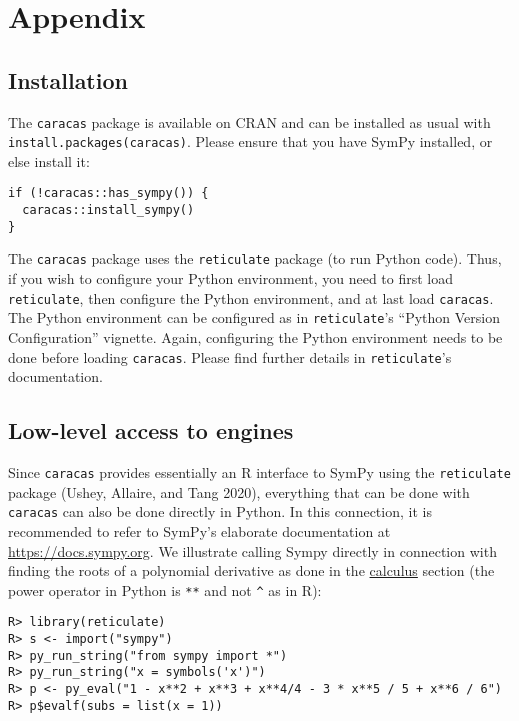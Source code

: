 \hypertarget{appendix}{%
\section{Appendix}\label{appendix}}

\hypertarget{installation}{%
\subsection{Installation}\label{installation}}

The \texttt{caracas} package is available on CRAN and can be installed as usual with \texttt{install.packages(\textquotesingle{}caracas\textquotesingle{})}.
Please ensure that you have SymPy installed, or else install it:

\begin{verbatim}
if (!caracas::has_sympy()) {
  caracas::install_sympy()
}
\end{verbatim}

The \texttt{caracas} package uses the \texttt{reticulate} package (to run Python code).
Thus, if you wish to configure your Python environment, you need to
first load \texttt{reticulate}, then configure the Python environment, and at
last load \texttt{caracas}.
The Python environment can be configured as
in \texttt{reticulate}'s ``Python Version Configuration'' vignette.
Again, configuring the Python environment needs to be done before
loading \texttt{caracas}.
Please find further details in \texttt{reticulate}'s documentation.

\hypertarget{low-level-access-to-engines}{%
\subsection{Low-level access to engines}\label{low-level-access-to-engines}}

Since \texttt{caracas} provides essentially an R interface to SymPy using
the \texttt{reticulate} package (Ushey, Allaire, and Tang 2020), everything that can be done
with \texttt{caracas} can also be done directly in Python. In this
connection, it is recommended to refer to SymPy's elaborate
documentation at \url{https://docs.sympy.org}. We illustrate calling Sympy
directly in connection with finding the roots of a polynomial
derivative as done in the \protect\hyperlink{calculus}{calculus} section (the power operator in
Python is \texttt{**} and not \texttt{\^{}} as in R):

\begin{verbatim}
R> library(reticulate)
R> s <- import("sympy") 
R> py_run_string("from sympy import *")
R> py_run_string("x = symbols('x')")
R> p <- py_eval("1 - x**2 + x**3 + x**4/4 - 3 * x**5 / 5 + x**6 / 6")
R> p$evalf(subs = list(x = 1))
\end{verbatim}

